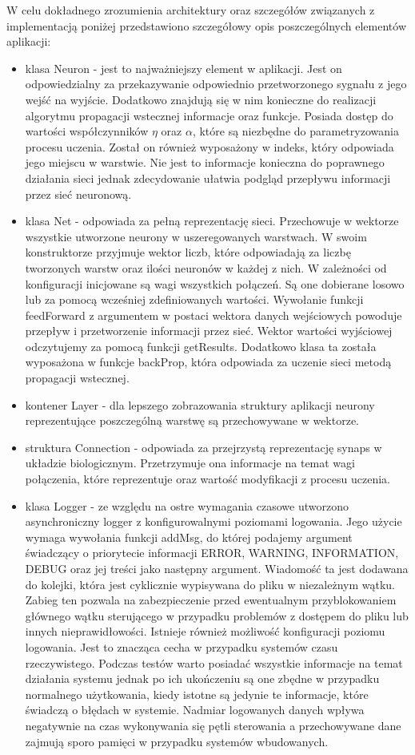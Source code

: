 W celu dokładnego zrozumienia architektury oraz szczegółów związanych z implementacją poniżej przedstawiono szczegółowy opis poszczególnych elementów aplikacji:
\begin{itemize}
	\item klasa Neuron - jest to najważniejszy element w aplikacji. Jest on odpowiedzialny za przekazywanie odpowiednio przetworzonego sygnału z jego wejść na wyjście. Dodatkowo znajdują się w nim konieczne do realizacji algorytmu propagacji wstecznej informacje oraz funkcje. Posiada dostęp do wartości współczynników $\eta$ oraz $\alpha$, które są niezbędne do parametryzowania procesu uczenia. Został on również wyposażony w indeks, który odpowiada jego miejscu w warstwie. Nie jest to informacje konieczna do poprawnego działania sieci jednak zdecydowanie ułatwia podgląd przepływu informacji przez sieć neuronową.  
	\item klasa Net - odpowiada za pełną reprezentację sieci. Przechowuje w wektorze wszystkie utworzone neurony w uszeregowanych warstwach. W swoim konstruktorze przyjmuje wektor liczb, które odpowiadają za liczbę tworzonych warstw oraz ilości neuronów w każdej z nich. W zależności od konfiguracji inicjowane są wagi wszystkich połączeń. Są one dobierane losowo lub za pomocą wcześniej zdefiniowanych wartości. Wywołanie funkcji feedForward z argumentem w postaci wektora danych wejściowych powoduje przepływ i przetworzenie informacji przez sieć. Wektor wartości wyjściowej odczytujemy za pomocą funkcji getResults. Dodatkowo klasa ta została wyposażona w funkcje backProp, która odpowiada za uczenie sieci metodą propagacji wstecznej. 
	\item kontener Layer - dla lepszego zobrazowania struktury aplikacji neurony reprezentujące poszczególną warstwę są przechowywane w wektorze. 
	\item struktura Connection - odpowiada za przejrzystą reprezentację synaps w układzie biologicznym. Przetrzymuje ona informacje na temat wagi połączenia, które reprezentuje oraz wartość modyfikacji z procesu uczenia.
	\item klasa Logger - ze względu na ostre wymagania czasowe utworzono asynchroniczny logger z konfigurowalnymi poziomami logowania. Jego użycie wymaga wywołania funkcji addMsg, do której podajemy argument świadczący o priorytecie informacji ERROR, WARNING, INFORMATION, DEBUG oraz jej treści jako następny argument. Wiadomość ta jest dodawana do kolejki, która jest cyklicznie wypisywana do pliku w niezależnym wątku. Zabieg ten pozwala na zabezpieczenie przed ewentualnym przyblokowaniem głównego wątku sterującego w przypadku problemów z dostępem do pliku lub innych nieprawidłowości. Istnieje również możliwość konfiguracji poziomu logowania. Jest to znacząca cecha w przypadku systemów czasu rzeczywistego. Podczas testów warto posiadać wszystkie informacje na temat działania systemu jednak po ich ukończeniu są one zbędne w przypadku normalnego użytkowania, kiedy istotne są jedynie te informacje, które świadczą o błędach w systemie. Nadmiar logowanych danych wpływa negatywnie na czas wykonywania się pętli sterowania a przechowywane dane zajmują sporo pamięci w przypadku systemów wbudowanych.

\end{itemize}
